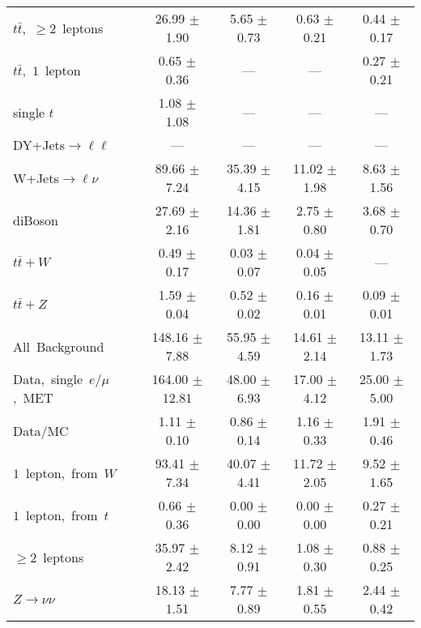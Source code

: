 \documentclass{article}
\begin{document}
\begin{longtable}{|l|c|c|c|c|}
$t\bar{t}$,~$\ge2$~leptons & 26.99 $\pm$ 1.90  & 5.65 $\pm$ 0.73  & 0.63 $\pm$ 0.21  & 0.44 $\pm$ 0.17 \\* 
$t\bar{t}$,~$1$~lepton & 0.65 $\pm$ 0.36  & ---  & ---  & 0.27 $\pm$ 0.21 \\* 
single $t$  & 1.08 $\pm$ 1.08  & ---  & ---  & --- \\* 
DY+Jets$\rightarrow\ell\ell$  & ---  & ---  & ---  & --- \\* 
W+Jets$\rightarrow\ell\nu$  & 89.66 $\pm$ 7.24  & 35.39 $\pm$ 4.15  & 11.02 $\pm$ 1.98  & 8.63 $\pm$ 1.56 \\* 
diBoson  & 27.69 $\pm$ 2.16  & 14.36 $\pm$ 1.81  & 2.75 $\pm$ 0.80  & 3.68 $\pm$ 0.70 \\* 
$t\bar{t}+W$  & 0.49 $\pm$ 0.17  & 0.03 $\pm$ 0.07  & 0.04 $\pm$ 0.05  & --- \\* 
$t\bar{t}+Z$  & 1.59 $\pm$ 0.04  & 0.52 $\pm$ 0.02  & 0.16 $\pm$ 0.01  & 0.09 $\pm$ 0.01 \\* 
\hline \hline 
All~Background  & 148.16 $\pm$ 7.88  & 55.95 $\pm$ 4.59  & 14.61 $\pm$ 2.14  & 13.11 $\pm$ 1.73 \\* 
Data,~single~$e/\mu$,~MET  & 164.00 $\pm$ 12.81  & 48.00 $\pm$ 6.93  & 17.00 $\pm$ 4.12  & 25.00 $\pm$ 5.00 \\* 
Data/MC  & 1.11 $\pm$ 0.10  & 0.86 $\pm$ 0.14  & 1.16 $\pm$ 0.33  & 1.91 $\pm$ 0.46 \\* 
\hline \hline 
$1$~lepton,~from~$W$  & 93.41 $\pm$ 7.34  & 40.07 $\pm$ 4.41  & 11.72 $\pm$ 2.05  & 9.52 $\pm$ 1.65 \\* 
$1$~lepton,~from~$t$  & 0.66 $\pm$ 0.36  & 0.00 $\pm$ 0.00  & 0.00 $\pm$ 0.00  & 0.27 $\pm$ 0.21 \\* 
$\ge2$~leptons  & 35.97 $\pm$ 2.42  & 8.12 $\pm$ 0.91  & 1.08 $\pm$ 0.30  & 0.88 $\pm$ 0.25 \\* 
$Z\rightarrow\nu\nu$  & 18.13 $\pm$ 1.51  & 7.77 $\pm$ 0.89  & 1.81 $\pm$ 0.55  & 2.44 $\pm$ 0.42 \\* 
\hline 
\end{longtable} 

 
 
 
 
\pagebreak 

 
 
 
 
\end{document}
